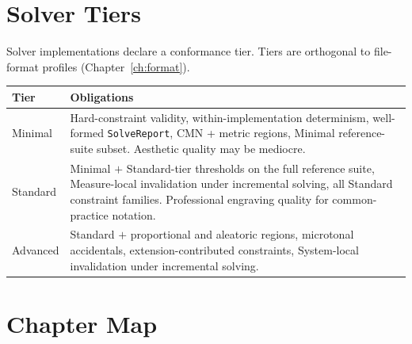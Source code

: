 \documentclass[11pt,letterpaper]{report}
\begin{document}
\section*{Solver Tiers}

Solver implementations declare a conformance tier. Tiers are
orthogonal to file-format profiles
(Chapter~\ref{ch:format}).

\begin{longtable}{p{3.0cm} p{11.0cm}}
  \toprule
  \textbf{Tier} & \textbf{Obligations} \\
  \midrule
  \endhead
  Minimal &
    Hard-constraint validity, within-implementation determinism,
    well-formed \texttt{SolveReport}, CMN + metric regions,
    Minimal reference-suite subset. Aesthetic quality may be
    mediocre. \\
  Standard &
    Minimal $+$ Standard-tier thresholds on the full reference
    suite, Measure-local invalidation under incremental solving,
    all Standard constraint families. Professional engraving
    quality for common-practice notation. \\
  Advanced &
    Standard $+$ proportional and aleatoric regions, microtonal
    accidentals, extension-contributed constraints, System-local
    invalidation under incremental solving. \\
  \bottomrule
\end{longtable}

\section*{Chapter Map}
\end{document}
